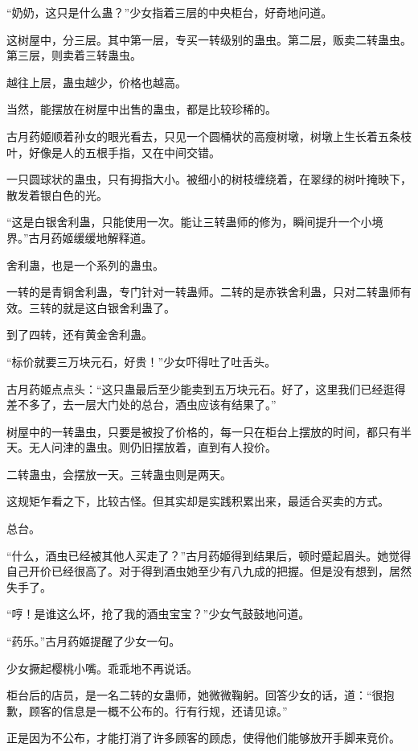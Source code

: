 
\begin{this_body}

“奶奶，这只是什么蛊？”少女指着三层的中央柜台，好奇地问道。

这树屋中，分三层。其中第一层，专买一转级别的蛊虫。第二层，贩卖二转蛊虫。第三层，则卖着三转蛊虫。

越往上层，蛊虫越少，价格也越高。

当然，能摆放在树屋中出售的蛊虫，都是比较珍稀的。

古月药姬顺着孙女的眼光看去，只见一个圆桶状的高瘦树墩，树墩上生长着五条枝叶，好像是人的五根手指，又在中间交错。

一只圆球状的蛊虫，只有拇指大小。被细小的树枝缠绕着，在翠绿的树叶掩映下，散发着银白色的光。

“这是白银舍利蛊，只能使用一次。能让三转蛊师的修为，瞬间提升一个小境界。”古月药姬缓缓地解释道。

舍利蛊，也是一个系列的蛊虫。

一转的是青铜舍利蛊，专门针对一转蛊师。二转的是赤铁舍利蛊，只对二转蛊师有效。三转的就是这白银舍利蛊了。

到了四转，还有黄金舍利蛊。

“标价就要三万块元石，好贵！”少女吓得吐了吐舌头。

古月药姬点点头：“这只蛊最后至少能卖到五万块元石。好了，这里我们已经逛得差不多了，去一层大门处的总台，酒虫应该有结果了。”

树屋中的一转蛊虫，只要是被投了价格的，每一只在柜台上摆放的时间，都只有半天。无人问津的蛊虫。则仍旧摆放着，直到有人投价。

二转蛊虫，会摆放一天。三转蛊虫则是两天。

这规矩乍看之下，比较古怪。但其实却是实践积累出来，最适合买卖的方式。

总台。

“什么，酒虫已经被其他人买走了？”古月药姬得到结果后，顿时蹙起眉头。她觉得自己开价已经很高了。对于得到酒虫她至少有八九成的把握。但是没有想到，居然失手了。

“哼！是谁这么坏，抢了我的酒虫宝宝？”少女气鼓鼓地问道。

“药乐。”古月药姬提醒了少女一句。

少女撅起樱桃小嘴。乖乖地不再说话。

柜台后的店员，是一名二转的女蛊师，她微微鞠躬。回答少女的话，道：“很抱歉，顾客的信息是一概不公布的。行有行规，还请见谅。”

正是因为不公布，才能打消了许多顾客的顾虑，使得他们能够放开手脚来竞价。


\end{this_body}
